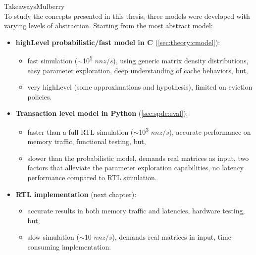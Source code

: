 \begin{highlight}{Takeaways}{Mulberry}
     \\
    To study the concepts presented in this thesis, three models were developed with varying levels of abstraction. Starting from the most abstract model:
    \begin{itemize}
        \item \textbf{\Gls{highLevel} probabilistic/fast model in C} (\ref{sec:theory:cmodel}):
        \begin{itemize}
            \item fast simulation ($\sim$10\textsuperscript{5} $nnz/s$), using generic matrix density distributions, easy parameter exploration, deep understanding of cache behaviors, but,
            \item very \gls{highLevel} (some approximations and hypothesis), limited on \gls{eviction} policies.
        \end{itemize}
        \item \textbf{Transaction level model in Python} (\ref{sec:spdc:eval}):
        \begin{itemize}
            \item faster than a full RTL simulation ($\sim$10\textsuperscript{3} $nnz/s$), accurate performance on memory traffic, functional testing, but,
            \item slower than the probabilistic model, demands real matrices as input, two factors that alleviate the parameter exploration capabilities, no latency performance compared to RTL simulation.
        \end{itemize}
        \item \textbf{RTL implementation} (next chapter):
        \begin{itemize}
            \item accurate results in both memory traffic and latencies, hardware testing, but,
            \item slow simulation ($\sim$10 $nnz/s$), demands real matrices in input, time-consuming implementation.
        \end{itemize}
    \end{itemize}

    \bigskip


\end{highlight}
